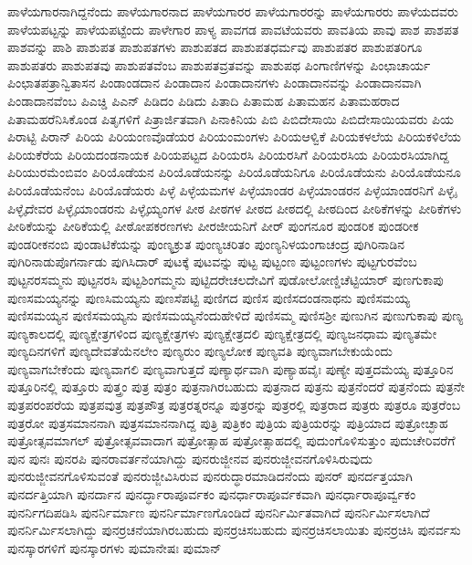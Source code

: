 {ಪಾಳೆಯಗಾರನಾಗಿದ್ದನೆಂದು
ಪಾಳೆಯಗಾರನಾದ
ಪಾಳೆಯಗಾರರ
ಪಾಳೆಯಗಾರರನ್ನು
ಪಾಳೆಯಗಾರರು
ಪಾಳೆಯದವರು
ಪಾಳೆಯಪಟ್ಟನ್ನು
ಪಾಳೆಯಪಟ್ಟೆಂದು
ಪಾಳೇಗಾರ
ಪಾಳ್ಯ
ಪಾವಗಡ
ಪಾವಟೆಯವರು
ಪಾವತಿಯ
ಪಾವು
ಪಾಶ
ಪಾಶಪತ
ಪಾಶವನ್ನು
ಪಾಶಿ
ಪಾಶುಪತ
ಪಾಶುಪತಗಳು
ಪಾಶುಪತದ
ಪಾಶುಪತಧರ್ಮವು
ಪಾಶುಪತರ
ಪಾಶುಪತರಿಗೂ
ಪಾಶುಪತರು
ಪಾಶುಪತವು
ಪಾಶುಪತವೆಂಬ
ಪಾಶುಪತವ್ರತವನ್ನು
ಪಾಶುಪಥ
ಪಿಂಗಾಣಿಗಳನ್ನು
ಪಿಂಛಾಚಾರ್ಯ
ಪಿಂಛಾತಪತ್ರಾನ್ವಿತಾಸನ
ಪಿಂಡಾಂಡದಾನ
ಪಿಂಡಾದಾನ
ಪಿಂಡಾದಾನಗಳು
ಪಿಂಡಾದಾನವನ್ನು
ಪಿಂಡಾದಾನವಾಗಿ
ಪಿಂಡಾದಾನವೆಂಬ
ಪಿಎಚ್ಡಿ
ಪಿಎನ್
ಪಿಡಿದಂ
ಪಿಡಿದು
ಪಿತಾದಿ
ಪಿತಾಮಹ
ಪಿತಾಮಹನ
ಪಿತಾಮಹರಾದ
ಪಿತಾಮಹರೆನಿಸಿಕೊಂಡ
ಪಿತೃಗಳಿಗೆ
ಪಿತ್ರಾರ್ಜಿತವಾಗಿ
ಪಿನಾಕಿನಿಯ
ಪಿಬಿ
ಪಿಬಿದೇಸಾಯಿ
ಪಿಬಿದೇಸಾಯಿಯವರು
ಪಿಯ
ಪಿರಾಟ್ಟಿ
ಪಿರಾನ್
ಪಿರಿಯ
ಪಿರಿಯಂಣವೊಡೆಯರ
ಪಿರಿಯಂಮಂಗಳು
ಪಿರಿಯಆಳ್ವಿಕೆ
ಪಿರಿಯಕಳಲೆಯ
ಪಿರಿಯಕಳಿಲೆಯ
ಪಿರಿಯಕೆರೆಯ
ಪಿರಿಯದಂಡನಾಯಕ
ಪಿರಿಯಪಟ್ಟದ
ಪಿರಿಯರಸಿ
ಪಿರಿಯರಸಿಗೆ
ಪಿರಿಯರಸಿಯ
ಪಿರಿಯರಸಿಯಾಗಿದ್ದ
ಪಿರಿಯುರಮೆಂಬಿವಂ
ಪಿರಿಯೊಡೆಯನ
ಪಿರಿಯೊಡೆಯನನ್ನು
ಪಿರಿಯೊಡೆಯನಿಗೂ
ಪಿರಿಯೊಡೆಯನು
ಪಿರಿಯೊಡೆಯನೂ
ಪಿರಿಯೊಡೆಯನೆಂಬ
ಪಿರಿಯೊಡೆಯರು
ಪಿಳ್ಳೆ
ಪಿಳ್ಳೆಯಮಗಳ
ಪಿಳ್ಳೆಯಾಂಡರ
ಪಿಳ್ಳೆಯಾಂಡರನ
ಪಿಳ್ಳೆಯಾಂಡರನಿಗೆ
ಪಿಳ್ಳೈ
ಪಿಳ್ಳೈದೇವರ
ಪಿಳ್ಳೈಯಾಂಡರನು
ಪಿಳ್ಳೈಯ್ಯಂಗಳ
ಪೀಠ
ಪೀಠಗಳ
ಪೀಠದ
ಪೀಠದಲ್ಲಿ
ಪೀಠದಿಂದ
ಪೀಠಿಕೆಗಳನ್ನು
ಪೀಠಿಕೆಗಳು
ಪೀಠಿಕೆಯನ್ನು
ಪೀಠಿಕೆಯಲ್ಲಿ
ಪೀಠೋಪಕರಣಗಳು
ಪೀರಜೀಯನಿಗೆ
ಪೀರ್
ಪುಂಗನೂರ
ಪುಂಡರಿಕ
ಪುಂಡರೀಕ
ಪುಂಡರೀಕನಂಬಿ
ಪುಂಡಾಟಿಕೆಯನ್ನು
ಪುಂಣ್ಯಕ್ರುತ
ಪುಂಣ್ಯಚರಿತಂ
ಪುಂಣ್ಯನಿಳಯಂಗಾಚಂದ್ರ
ಪುಗಿರಿನಾಡಿನ
ಪುಗಿರಿನಾಡುಪೊಗರ್ನಾಡು
ಪುಗಿಸಿದಾರ್
ಪುಟಕ್ಕೆ
ಪುಟವನ್ನು
ಪುಟ್ಟ
ಪುಟ್ಟಂಣ
ಪುಟ್ಟಂಣಗಳು
ಪುಟ್ಟಗುರವೆಂಬ
ಪುಟ್ಟನರಸಮ್ಮನು
ಪುಟ್ಟನರಸಿ
ಪುಟ್ಟಶಿಂಗಮ್ಮನು
ಪುಟ್ಟಿದರೇಚಲದೇವಿಗೆ
ಪುಡೋಲೋಣ್ಡಿಚೆಟ್ಟಿಯಾರ್
ಪುಣಗುಕಾಪು
ಪುಣಸಮಯ್ಯನನ್ನು
ಪುಣಸಿಮಯ್ಯನು
ಪುಣಸೆಪಟ್ಟಿ
ಪುಣಿಗದ
ಪುಣಿಸ
ಪುಣಿಸದಂಡನಾಥನು
ಪುಣಿಸಮಯ್ಯ
ಪುಣಿಸಮಯ್ಯನ
ಪುಣಿಸಮಯ್ಯನು
ಪುಣಿಸಮಯ್ಯನೆಂದುಹೇಳಿದೆ
ಪುಣಿಸಮ್ಮ
ಪುಣಿಸಶ್ರೀ
ಪುಣುಗಿನ
ಪುಣುಗುಕಾಪು
ಪುಣ್ಯ
ಪುಣ್ಯಕಾಲದಲ್ಲಿ
ಪುಣ್ಯಕ್ಷೇತ್ರಗಳಿಂದ
ಪುಣ್ಯಕ್ಷೇತ್ರಗಳು
ಪುಣ್ಯಕ್ಷೇತ್ರದಲಿ
ಪುಣ್ಯಕ್ಷೇತ್ರದಲ್ಲಿ
ಪುಣ್ಯಜನಧಾಮ
ಪುಣ್ಯತಮೇ
ಪುಣ್ಯದಿನಗಳಿಗೆ
ಪುಣ್ಯದೇವತೆಯೆನಲೇಂ
ಪುಣ್ಯರುಂ
ಪುಣ್ಯಲೋಕ
ಪುಣ್ಯವತಿ
ಪುಣ್ಯವಾಗಬೇಕುಯೆಂದು
ಪುಣ್ಯವಾಗಬೇಕೆಂದು
ಪುಣ್ಯವಾಗಲಿ
ಪುಣ್ಯವಾಗುತ್ತದೆ
ಪುಣ್ಯಾರ್ಥವಾಗಿ
ಪುಣ್ಯಾಹವೈಃ
ಪುಣ್ಯೇ
ಪುತ್ತದಮೆಯ್ಯ
ಪುತ್ತೂರಿನ
ಪುತ್ತೂರಿನಲ್ಲಿ
ಪುತ್ತೂರು
ಪುತ್ತ್ರಂ
ಪುತ್ರ
ಪುತ್ರಂ
ಪುತ್ರನಾಗಿರಬಹುದು
ಪುತ್ರನಾದ
ಪುತ್ರನು
ಪುತ್ರನೆಂದರೆ
ಪುತ್ರನೆಂದು
ಪುತ್ರನೇ
ಪುತ್ರಪರಂಪರೆಯ
ಪುತ್ರಪವುತ್ರ
ಪುತ್ರಪೌತ್ರ
ಪುತ್ರರತ್ನರನ್ನೂ
ಪುತ್ರರನ್ನು
ಪುತ್ರರಲ್ಲಿ
ಪುತ್ರರಾದ
ಪುತ್ರರು
ಪುತ್ರರೂ
ಪುತ್ರರೆಂಬ
ಪುತ್ರರೋ
ಪುತ್ರಸಮಾನನಾಗಿ
ಪುತ್ರಸಮಾನನಾಗಿದ್ದ
ಪುತ್ರಿ
ಪುತ್ರಿಕಂ
ಪುತ್ರಿಯ
ಪುತ್ರಿಯರನ್ನು
ಪುತ್ರಿಯಾದ
ಪುತ್ರೋಚ್ಛಾಹ
ಪುತ್ರೋತ್ಸವಮಾಗಲ್
ಪುತ್ರೋತ್ಸವವಾದಾಗ
ಪುತ್ರೋತ್ಸಾಹ
ಪುತ್ರೋತ್ಸಾಹದಲ್ಲಿ
ಪುದುಂಗೊಳಿಸುತ್ತುಂ
ಪುದುಚೇರಿವರೆಗೆ
ಪುನ
ಪುನಃ
ಪುನರಪಿ
ಪುನರಾವರ್ತನೆಯಾಗಿದ್ದು
ಪುನರುಜ್ಜೀನವ
ಪುನರುಜ್ಜೀವನಗೊಳಿಸಿರುವುದು
ಪುನರುಜ್ಜೀವನಗೊಳಿಸುವಂತೆ
ಪುನರುಜ್ಜೀವಿಸಿರುವ
ಪುನರುದ್ಧಾರಮಾಡಿದನೆಂದು
ಪುನರ್
ಪುನರ್ದತ್ತಯಾಗಿ
ಪುನರ್ದತ್ತಿಯಾಗಿ
ಪುನರ್ದಾನ
ಪುನರ್ದ್ಧಾರಾಪೂರ್ವಕಂ
ಪುನರ್ಧಾರಾಪೂರ್ವಕವಾಗಿ
ಪುನರ್ಧಾರಾಪೂರ್ವ್ವಕಂ
ಪುನರ್ನಿಗದಿಪಡಿಸಿ
ಪುನರ್ನಿರ್ಮಾಣ
ಪುನರ್ನಿರ್ಮಾಣಗೊಂಡಿದೆ
ಪುನರ್ನಿರ್ಮಿತವಾಗಿದೆ
ಪುನರ್ನಿರ್ಮಿಸಲಾಗಿದೆ
ಪುನರ್ನಿರ್ಮಿಸಲಾಗಿದ್ದು
ಪುನರ್ರಚನೆಯಾಗಿರಬಹುದು
ಪುನರ್ರಚಿಸಬಹುದು
ಪುನರ್ರಚಿಸಲಾಯಿತು
ಪುನರ್ರಚಿಸಿ
ಪುನರ್ವಸು
ಪುನಸ್ಕಾರಗಳಿಗೆ
ಪುನಸ್ಕಾರಗಳು
ಪುಮಾನೇಷಃ
ಪುಮಾನ್
}
